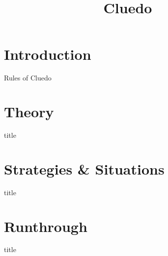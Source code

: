 \documentclass{beamer}
\title{Cluedo}
\author[Laura van de Braak, Luuk Boulogne \& Ren\'e Mellema}
\date{}
\begin{document}
\begin{frame}
    \titlepage
\end{frame}

\begin{frame}[Content]
  \tableofcontents
\end{frame}

\section{Introduction}

\begin{frame}{Rules of Cluedo}
  
\end{frame}

\section{Theory}

\begin{frame}{title}

\end{frame}

\section{Strategies \& Situations}

\begin{frame}{title}

\end{frame}

\section{Runthrough}

\begin{frame}{title}

\end{frame}
\end{document}
